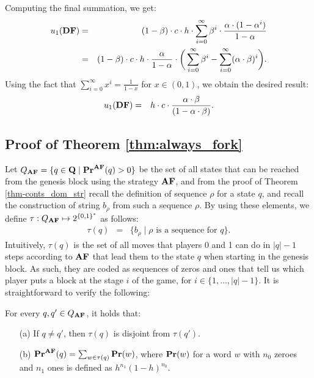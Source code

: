 Computing the final summation, we get:
\begin{eqnarray*}	
u_1(\text{\rm {\bf DF}}) & = & (1-\beta) \cdot c \cdot h\cdot \sum_{i=0}^{\infty}\beta^{i} \cdot \frac{\alpha\cdot (1-\alpha^i)}{1-\alpha}\\
 & = & (1-\beta) \cdot c \cdot h\cdot \frac{\alpha}{1-\alpha} \cdot \bigg(\sum_{i=0}^{\infty}\beta^{i} - \sum_{i=0}^{\infty}(\alpha \cdot \beta)^i \bigg).
\end{eqnarray*}
Using the fact that $\sum_{i=0}^{\infty}x^i= \frac{1}{1-x}$ for $x \in (0,1)$, we obtain the desired result:
\begin{eqnarray*}
u_1(\text{\rm {\bf DF}}) & = & h\cdot c\cdot\frac{\alpha\cdot\beta}{(1-\alpha\cdot\beta)}.
\end{eqnarray*}


\subsection{Proof of Theorem \ref{thm:always_fork}}
Let $Q_{\text{\rm {\bf AF}}} = \{q \in \mathbf{Q} \mid \mathbf{Pr}^{\text{\rm {\bf AF}}}(q) > 0\}$ be the set of all states that can be reached from the genesis block using the strategy $\text{\rm {\bf AF}}$, and from the proof of Theorem \ref{thm-conts_dom_str} recall the definition of sequence $\rho$ for a state $q$, and recall the construction of string $b_\rho$ from such a sequence $\rho$.
By using these elements, we define $\tau:Q_{\text{\rm {\bf AF}}} \mapsto 2^{\{0,1\}^*}$ as follows:
\begin{eqnarray*}
\tau(q) & = & \{ b_\rho \mid \rho \text{ is a sequence for } q\}.
\end{eqnarray*}
Intuitively, $\tau(q)$ is the set of all moves that players 0 and 1 can do in $|q|-1$ steps according to $\text{\rm {\bf AF}}$ that lead them to the state $q$ when starting in the genesis block. As such, they are coded as sequences of zeros and ones that tell us which player puts a block at the stage $i$ of the game, for $i \in \{ 1,\ldots, |q|-1\}$. It is straightforward to verify the following:
\begin{myclaim}\label{claim-words-app} For every $q, q'\in Q_{\text{\rm {\bf AF}}}$, it holds that:
\begin{itemize}
\item[(a)] If $q\neq q'$, then $\tau(q)$ is disjoint from $\tau(q')$.
\item[(b)] $\mathbf{Pr}^{\text{\rm {\bf AF}}}(q) = \sum_{w \in \tau(q)} \mathbf{Pr}(w)$, where $\mathbf{Pr}(w)$ for a word $w$ with $n_0$ zeroes and $n_1$ ones is  defined as 
$h^{n_1}(1-h)^{n_0}$.
\end{itemize}
\end{myclaim}
